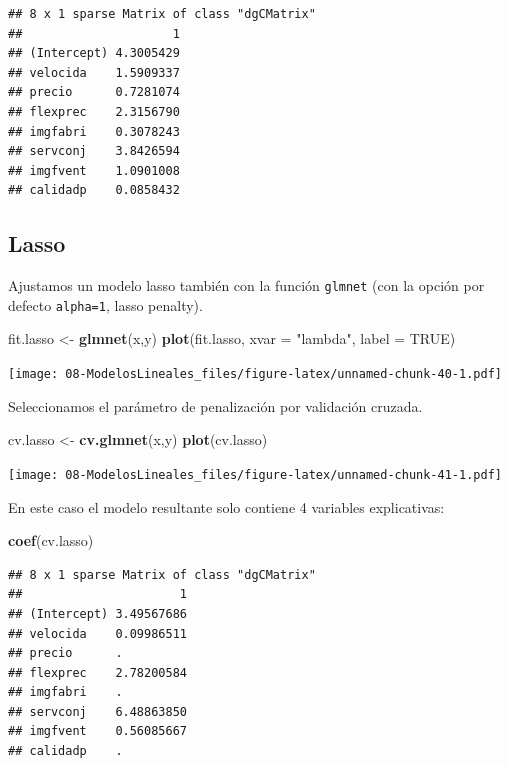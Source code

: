 \documentclass[]{book}
\newenvironment{Shaded}{\begin{snugshade}}{\end{snugshade}}
\newcommand{\KeywordTok}[1]{\textcolor[rgb]{0.13,0.29,0.53}{\textbf{#1}}}
\newcommand{\DataTypeTok}[1]{\textcolor[rgb]{0.13,0.29,0.53}{#1}}
\newcommand{\StringTok}[1]{\textcolor[rgb]{0.31,0.60,0.02}{#1}}
\newcommand{\OtherTok}[1]{\textcolor[rgb]{0.56,0.35,0.01}{#1}}
\newcommand{\NormalTok}[1]{#1}
\begin{document}
\begin{verbatim}
## 8 x 1 sparse Matrix of class "dgCMatrix"
##                     1
## (Intercept) 4.3005429
## velocida    1.5909337
## precio      0.7281074
## flexprec    2.3156790
## imgfabri    0.3078243
## servconj    3.8426594
## imgfvent    1.0901008
## calidadp    0.0858432
\end{verbatim}

\subsection{Lasso}\label{lasso}

Ajustamos un modelo lasso también con la función \texttt{glmnet} (con la
opción por defecto \texttt{alpha=1}, lasso penalty).

\begin{Shaded}
\begin{Highlighting}[]
\NormalTok{fit.lasso <-}\StringTok{ }\KeywordTok{glmnet}\NormalTok{(x,y)}
\KeywordTok{plot}\NormalTok{(fit.lasso, }\DataTypeTok{xvar =} \StringTok{"lambda"}\NormalTok{, }\DataTypeTok{label =} \OtherTok{TRUE}\NormalTok{)}
\end{Highlighting}
\end{Shaded}

\texttt{[image: 08-ModelosLineales\_files/figure-latex/unnamed-chunk-40-1.pdf]}

Seleccionamos el parámetro de penalización por validación cruzada.

\begin{Shaded}
\begin{Highlighting}[]
\NormalTok{cv.lasso <-}\StringTok{ }\KeywordTok{cv.glmnet}\NormalTok{(x,y)}
\KeywordTok{plot}\NormalTok{(cv.lasso)}
\end{Highlighting}
\end{Shaded}

\texttt{[image: 08-ModelosLineales\_files/figure-latex/unnamed-chunk-41-1.pdf]}

En este caso el modelo resultante solo contiene 4 variables
explicativas:

\begin{Shaded}
\begin{Highlighting}[]
\KeywordTok{coef}\NormalTok{(cv.lasso)}
\end{Highlighting}
\end{Shaded}

\begin{verbatim}
## 8 x 1 sparse Matrix of class "dgCMatrix"
##                      1
## (Intercept) 3.49567686
## velocida    0.09986511
## precio      .         
## flexprec    2.78200584
## imgfabri    .         
## servconj    6.48863850
## imgfvent    0.56085667
## calidadp    .
\end{verbatim}
\end{document}
